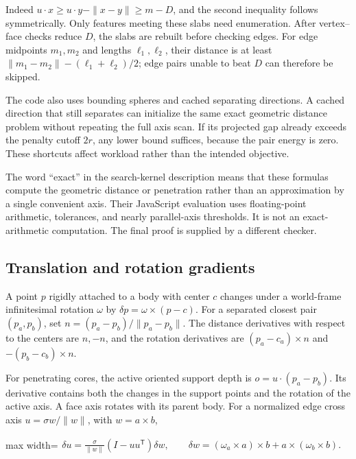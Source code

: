 \documentclass[11pt,a4paper]{article}
\begin{document}
Indeed \(u\cdot x\ge u\cdot y-\|x-y\|\ge m-D\), and the second inequality follows symmetrically. Only features meeting these slabs need enumeration. After vertex--face checks reduce \(D\), the slabs are rebuilt before checking edges. For edge midpoints \(m_1,m_2\) and lengths \(\ell_1,\ell_2\), their distance is at least \(\|m_1-m_2\|-(\ell_1+\ell_2)/2\); edge pairs unable to beat \(D\) can therefore be skipped.

The code also uses bounding spheres and cached separating directions. A cached direction that still separates can initialize the same exact geometric distance problem without repeating the full axis scan. If its projected gap already exceeds the penalty cutoff \(2r\), any lower bound suffices, because the pair energy is zero. These shortcuts affect workload rather than the intended objective.

The word ``exact'' in the search-kernel description means that these formulas compute the geometric distance or penetration rather than an approximation by a single convenient axis. Their JavaScript evaluation uses floating-point arithmetic, tolerances, and nearly parallel-axis thresholds. It is not an exact-arithmetic computation. The final proof is supplied by a different checker.

\subsection{Translation and rotation gradients}

A point \(p\) rigidly attached to a body with center \(c\) changes under a world-frame infinitesimal rotation \(\omega\) by \(\delta p=\omega\times(p-c)\). For a separated closest pair \((p_a,p_b)\), set \(n=(p_a-p_b)/\|p_a-p_b\|\). The distance derivatives with respect to the centers are \(n,-n\), and the rotation derivatives are \((p_a-c_a)\times n\) and \(-(p_b-c_b)\times n\).

For penetrating cores, the active oriented support depth is \(o=u\cdot(p_a-p_b)\). Its derivative contains both the changes in the support points and the rotation of the active axis. A face axis rotates with its parent body. For a normalized edge cross axis \(u=\sigma w/\|w\|\), with \(w=a\times b\),

\begin{center}\begin{adjustbox}{max width=\linewidth}$\displaystyle\begin{aligned}
\delta u=\frac{\sigma}{\|w\|}(I-uu^{\mathsf T})\delta w,
\qquad
\delta w=(\omega_a\times a)\times b+a\times(\omega_b\times b).
\end{aligned}$\end{adjustbox}\end{center}
\end{document}
